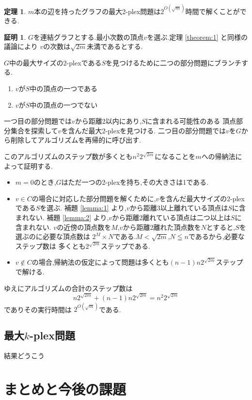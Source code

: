\documentclass{thesis}
\theoremstyle{definition}
\newtheorem{theorem}{定理}[chapter]
\newtheorem*{prf*}{証明}
\begin{document}
\begin{theorem} \label{theorem:2}
$m$本の辺を持ったグラフの最大2-plex問題は$2^{O(\sqrt{m})}$時間で解くことができる.
\begin{prf*}
$G$を連結グラフとする.最小次数の頂点$v$を選ぶ.定理 \ref{theorem:1} と同様の議論により
$v$の次数は$\sqrt{2m}$未満であるとする.

$G$中の最大サイズの2-plexである$S$を見つけるために二つの部分問題にブランチする.
\begin{enumerate}
 \item $v$が$S$中の頂点の一つである
 \item $v$が$S$中の頂点の一つでない
\end{enumerate}
一つ目の部分問題では$v$から距離2以内にあり,$S$に含まれる可能性のある
頂点部分集合を探索して$v$を含んだ最大2-plexを見つける.
二つ目の部分問題では$v$を$G$から削除してアルゴリズムを再帰的に呼び出す.

このアルゴリズムのステップ数が多くとも$n^{2}2^{\sqrt{2m}}$になることを$m$への帰納法によって証明する.
\begin{itemize}
 \item $m = 0$のとき,$G$はただ一つの2-plexを持ち,その大きさは1である.	
 \item $v \in C$の場合に対応した部分問題を解くために,$v$を含んだ最大サイズの2-plexである$S$を選ぶ.
補題  \ref{lemma:1} より,$v$から距離3以上離れている頂点は$S$に含まれない.
補題  \ref{lemma:2} より,$v$から距離2離れている頂点は二つ以上は$S$に含まれない.
$v$の近傍の頂点数を$M$,$v$から距離2離れた頂点数を$N$とすると,$S$を選ぶのに必要な頂点数は
$2^{M} \times N$である.$M < \sqrt{2m}$,$N \leqq n$であるから,必要なステップ数は
多くとも$2^{\sqrt{2m}}$ステップである.
 \item $v \notin C$の場合,帰納法の仮定によって問題は多くとも$(n - 1)n2^{\sqrt{2m}}$ステップで解ける.
\end{itemize}
ゆえにアルゴリズムの合計のステップ数は
\[  n2^{\sqrt{2m}} +  (n - 1)n2^{\sqrt{2m}} = n^{2}2^{\sqrt{2m}} \]
でありその実行時間は $2^{O(\sqrt{m})}$である.
\end{prf*}
\end{theorem}

\section{最大$k$-plex問題}
結果どうこう

\newpage

\chapter{まとめと今後の課題}
\end{document}
